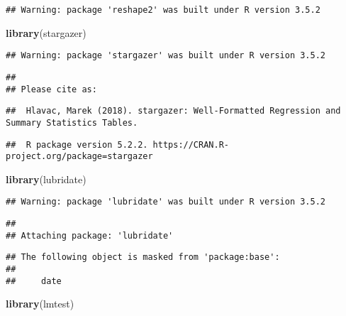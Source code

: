 \documentclass[]{article}
\newenvironment{Shaded}{\begin{snugshade}}{\end{snugshade}}
\newcommand{\KeywordTok}[1]{\textcolor[rgb]{0.13,0.29,0.53}{\textbf{#1}}}
\newcommand{\NormalTok}[1]{#1}
\begin{document}
\begin{verbatim}
## Warning: package 'reshape2' was built under R version 3.5.2
\end{verbatim}

\begin{Shaded}
\begin{Highlighting}[]
\KeywordTok{library}\NormalTok{(stargazer)}
\end{Highlighting}
\end{Shaded}

\begin{verbatim}
## Warning: package 'stargazer' was built under R version 3.5.2
\end{verbatim}

\begin{verbatim}
## 
## Please cite as:
\end{verbatim}

\begin{verbatim}
##  Hlavac, Marek (2018). stargazer: Well-Formatted Regression and Summary Statistics Tables.
\end{verbatim}

\begin{verbatim}
##  R package version 5.2.2. https://CRAN.R-project.org/package=stargazer
\end{verbatim}

\begin{Shaded}
\begin{Highlighting}[]
\KeywordTok{library}\NormalTok{(lubridate)}
\end{Highlighting}
\end{Shaded}

\begin{verbatim}
## Warning: package 'lubridate' was built under R version 3.5.2
\end{verbatim}

\begin{verbatim}
## 
## Attaching package: 'lubridate'
\end{verbatim}

\begin{verbatim}
## The following object is masked from 'package:base':
## 
##     date
\end{verbatim}

\begin{Shaded}
\begin{Highlighting}[]
\KeywordTok{library}\NormalTok{(lmtest)}
\end{Highlighting}
\end{Shaded}
\end{document}
